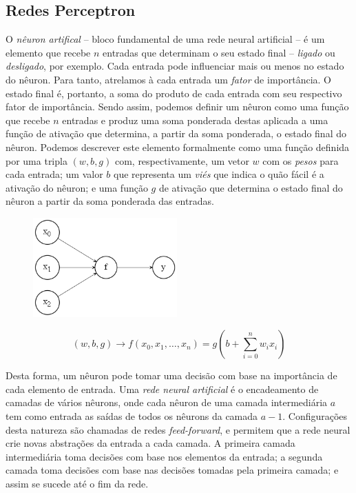 \documentclass[12pt, a4paper]{article}
\begin{document}
\subsection{Redes Perceptron}
O \emph{nêuron artifical} -- bloco fundamental de uma rede neural artificial -- é um elemento que recebe $n$ entradas que determinam o seu estado final -- \emph{ligado} ou \emph{desligado}, por exemplo. Cada entrada pode influenciar mais ou menos no estado do nêuron. Para tanto, atrelamos à cada entrada um \emph{fator} de importância. O estado final é, portanto, a soma do produto de cada entrada com seu respectivo fator de importância. Sendo assim, podemos definir um nêuron como uma função que recebe $n$ entradas e produz uma soma ponderada destas aplicada a uma função de ativação que determina, a partir da soma ponderada, o estado final do nêuron. Podemos descrever este elemento formalmente como uma função definida por uma tripla $(w, b, g)$ com, respectivamente, um vetor $w$ com os \emph{pesos} para cada entrada; um valor $b$ que representa um \emph{viés} que indica o quão fácil é a ativação do nêuron; e uma função $g$ de ativação que determina o estado final do nêuron a partir da soma ponderada das entradas.

\begin{figure}[ht]
	\centering
	\includegraphics[width=\textwidth, height=3.8cm, keepaspectratio=true]{fig/perceptron}
\end{figure}

\begin{equation}
(w, b, g) \rightarrow f(x_0, x_1, \dotsc, x_n) = g\left(b + \displaystyle\sum_{i=0}^{n} w_i x_i \right)
\end{equation}

Desta forma, um nêuron pode tomar uma decisão com base na importância de cada elemento de entrada. Uma \emph{rede neural artificial} é o encadeamento de camadas de vários nêurons, onde cada nêuron de uma camada intermediária $a$ tem como entrada as saídas de todos os nêurons da camada $a - 1$. Configurações desta natureza são chamadas de redes \emph{feed-forward}, e permitem que a rede neural crie novas abstrações da entrada a cada camada. A primeira camada intermediária toma decisões com base nos elementos da entrada; a segunda camada toma decisões com base nas decisões tomadas pela primeira camada; e assim se sucede até o fim da rede.
\end{document}

